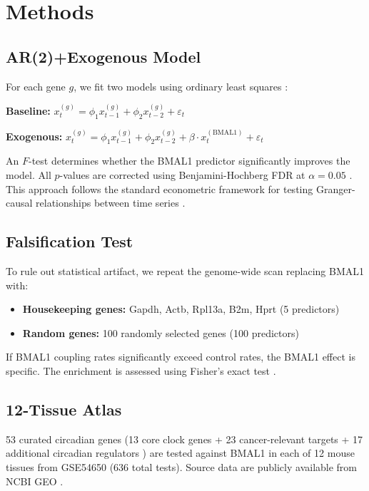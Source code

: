 \documentclass[11pt,letterpaper]{article}
\begin{document}
\section{Methods}

\subsection{AR(2)+Exogenous Model}

For each gene $g$, we fit two models using ordinary least squares \citep{hamilton1994time}:

\textbf{Baseline:} $x_t^{(g)} = \phi_1 x_{t-1}^{(g)} + \phi_2 x_{t-2}^{(g)} + \varepsilon_t$

\textbf{Exogenous:} $x_t^{(g)} = \phi_1 x_{t-1}^{(g)} + \phi_2 x_{t-2}^{(g)} + \beta \cdot x_t^{(\text{BMAL1})} + \varepsilon_t$

An $F$-test determines whether the BMAL1 predictor significantly improves the model. All $p$-values are corrected using Benjamini-Hochberg FDR at $\alpha = 0.05$ \citep{benjamini1995controlling}. This approach follows the standard econometric framework for testing Granger-causal relationships between time series \citep{granger1969investigating, box2015time}.

\subsection{Falsification Test}

To rule out statistical artifact, we repeat the genome-wide scan replacing BMAL1 with:
\begin{itemize}
\item \textbf{Housekeeping genes:} Gapdh, Actb, Rpl13a, B2m, Hprt (5 predictors)
\item \textbf{Random genes:} 100 randomly selected genes (100 predictors)
\end{itemize}

If BMAL1 coupling rates significantly exceed control rates, the BMAL1 effect is specific. The enrichment is assessed using Fisher's exact test \citep{fisher1935logic}.

\subsection{12-Tissue Atlas}

53 curated circadian genes (13 core clock genes \citep{takahashi2017transcriptional, ko2006molecular} + 23 cancer-relevant targets \citep{fu2003circadian, masri2015circadian} + 17 additional circadian regulators \citep{panda2002coordinated}) are tested against BMAL1 in each of 12 mouse tissues from GSE54650 \citep{zhang2014circadian} (636 total tests). Source data are publicly available from NCBI GEO \citep{barrett2013ncbi}.
\end{document}
